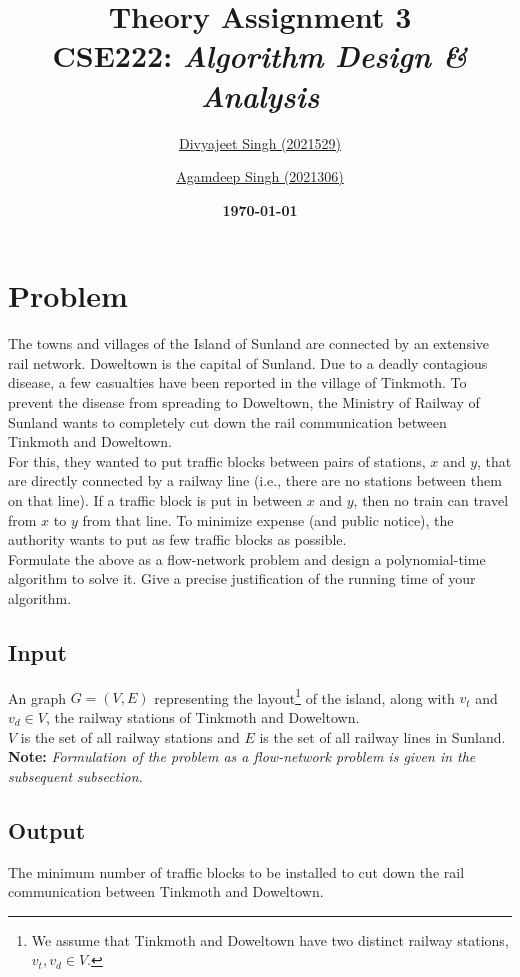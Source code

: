 \documentclass[12pt]{report}
\title{
    \textbf{\Huge{Theory Assignment 3}} \\
    \vspace*{15pt}
    \large{CSE222: \textit{Algorithm Design \& Analysis}}
}
\author{
    \href{mailto:divyajeet21529@iiitd.ac.in}{Divyajeet Singh (2021529)}
    \and
    \href{mailto:agamdeep21306@iiitd.ac.in}{Agamdeep Singh (2021306)}
}
\date{
    \vspace*{10pt}
    \textbf{\today}
}
\begin{document}
    \maketitle

    \section*{\huge{Problem}}
    The towns and villages of the Island of Sunland are connected by an extensive rail network.
    Doweltown is the capital of Sunland. Due to a deadly contagious disease,
    a few casualties have been reported in the village of Tinkmoth. To prevent the disease from
    spreading to Doweltown, the Ministry of Railway of Sunland wants to completely
    cut down the rail communication between Tinkmoth and Doweltown. \\
    For this, they wanted to put traffic blocks between pairs of stations, $x$ and $y$, that are
    directly connected by a railway line (i.e., there are no stations between them on that line).
    If a traffic block is put in between $x$ and $y$, then no train can travel from $x$ to $y$ from that
    line. To minimize expense (and public notice), the authority wants to put as few traffic blocks
    as possible. \\
    Formulate the above as a flow-network problem and design a polynomial-time algorithm to
    solve it. Give a precise justification of the running time of your algorithm.

    \subsection*{Input}
    An graph $G = (V, E)$ representing the layout\footnote{
        We assume that Tinkmoth and Doweltown have two distinct railway stations, $v_{t}, v_{d} \in V$.
    } of the island, along with $v_{t}$ and $v_{d} \in V$, the railway stations of Tinkmoth and Doweltown. \\
    $V$ is the set of all railway stations and $E$ is the set of all railway lines in Sunland.
    \vspace*{7.5pt} \\
    \textbf{Note:} \textit{Formulation of the problem as a flow-network problem is given in the subsequent subsection.}

    \subsection*{Output}
    The minimum number of traffic blocks to be installed to cut down the rail communication between Tinkmoth and Doweltown.
\end{document}
